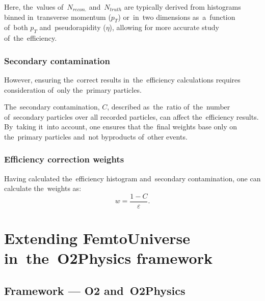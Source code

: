 \documentclass[11pt,a4paper,twoside]{book}
\numberwithin{equation}{chapter}
\begin{document}
Here, the values of $N_{recon.}$ and $N_{truth}$ are typically derived from histograms binned in transverse momentum ($p_T$) or in two dimensions as a function of both $p_T$ and pseudorapidity ($\eta$), allowing for more accurate study of the efficiency.


\subsection{Secondary contamination}

However, ensuring the correct results in the efficiency calculations requires consideration of only the primary particles.

The secondary contamination, $C$, described as the ratio of the number of secondary particles over all recorded particles, can affect the efficiency results. By taking it into account, one ensures that the final weights base only on the primary particles and not byproducts of other events.


\pagebreak


\subsection{Efficiency correction weights}

Having calculated the efficiency histogram and secondary contamination, one can calculate the weights as:
\begin{equation}
    w = \frac{1 - C}{\varepsilon}.
\end{equation}


\chapter{Extending FemtoUniverse in the O2Physics framework}
\pagestyle{fancy}

\section{Framework — O2 and O2Physics}
\end{document}
